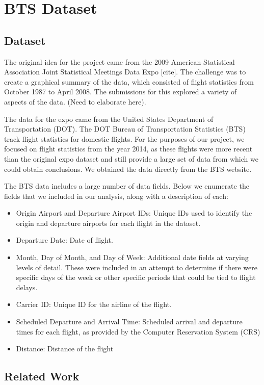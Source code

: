 \documentclass{article}
\begin{document}
\section{BTS Dataset}
\subsection{Dataset}

The original idea for the project came from the 2009 American Statistical Association Joint Statistical Meetings Data Expo [cite]. The challenge was to create a graphical summary of the data, which consisted of flight statistics from October 1987 to April 2008. The submissions for this explored a variety of aspects of the data. (Need to elaborate here).

The data for the expo came from the United States Department of Transportation (DOT). The DOT Bureau of Transportation Statistics (BTS) track flight statistics for domestic flights. For the purposes of our project, we focused on flight statistics from the year 2014, as these flights were more recent than the original expo dataset and still provide a large set of data from which we could obtain conclusions. We obtained the data directly from the BTS website.  

The BTS data includes a large number of data fields. Below we enumerate the fields that we included in our analysis, along with a description of each:

\begin{itemize}
\item Origin Airport and Departure Airport IDs: Unique IDs used to identify the origin and departure airports for each flight in the dataset. 
\item Departure Date: Date of flight. 
\item Month, Day of Month, and Day of Week: Additional date fields at varying levels of detail. These were included in an attempt to determine if there were specific days of the week or other specific periods that could be tied to flight delays. 
\item Carrier ID: Unique ID for the airline of the flight.
\item Scheduled Departure and Arrival Time: Scheduled arrival and departure times for each flight, as provided by the Computer Reservation System (CRS)
\item Distance: Distance of the flight
\end{itemize}

\subsection{Related Work}
\end{document}
